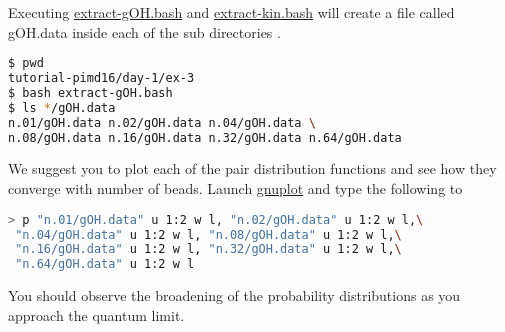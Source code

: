 \documentclass{article}
\begin{document}
\begin{Exercise}[label={water},title={Benchmark of quantum effects in a water molecule}]
\Question
Executing \url{extract-gOH.bash} and \url{extract-kin.bash} will create a file called gOH.data inside each of the sub directories .
\begin{lstlisting}[language=bash]
$ pwd
tutorial-pimd16/day-1/ex-3
$ bash extract-gOH.bash
$ ls */gOH.data  
n.01/gOH.data n.02/gOH.data n.04/gOH.data \
n.08/gOH.data n.16/gOH.data n.32/gOH.data n.64/gOH.data
\end{lstlisting}
We suggest you to plot each of the pair distribution functions and see how they converge with number of beads. Launch \url{gnuplot} and type the following to

\begin{lstlisting}[language=bash]
> p "n.01/gOH.data" u 1:2 w l, "n.02/gOH.data" u 1:2 w l,\
 "n.04/gOH.data" u 1:2 w l, "n.08/gOH.data" u 1:2 w l,\
 "n.16/gOH.data" u 1:2 w l, "n.32/gOH.data" u 1:2 w l,\
 "n.64/gOH.data" u 1:2 w l
\end{lstlisting}
You should observe the broadening of the probability distributions as you approach the quantum limit.
\end{Exercise}
\end{document}
